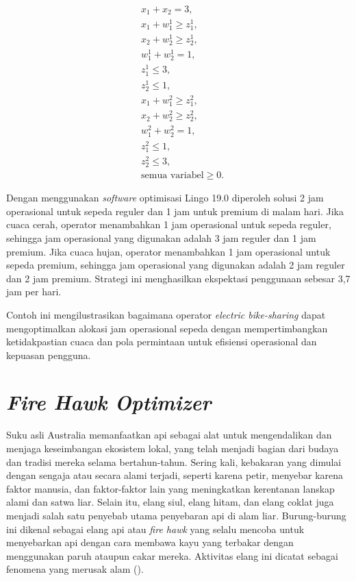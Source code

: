\begin{contoh}
    $$
    \begin{aligned}
    & x_1 + x_2 = 3, \\
    & x_1 + w_1^1 \geq z_1^1, \\
    & x_2 + w_2^1 \geq z_2^1, \\
    & w_1^1 + w_2^1 = 1, \\
    & z_1^1 \leq 3, \\
    & z_2^1 \leq 1, \\
    & x_1 + w_1^2 \geq z_1^2, \\
    & x_2 + w_2^2 \geq z_2^2, \\
    & w_1^2 + w_2^2 = 1, \\
    & z_1^2 \leq 1, \\
    & z_2^2 \leq 3, \\
    & \text{semua variabel} \geq 0.
    \end{aligned}
    $$
    
    Dengan menggunakan \textit{software} optimisasi Lingo 19.0 diperoleh solusi 2 jam operasional untuk sepeda reguler dan 1 jam untuk premium di malam hari. Jika cuaca cerah, operator menambahkan 1 jam operasional untuk sepeda reguler, sehingga jam operasional yang digunakan adalah 3 jam reguler dan 1 jam premium. Jika cuaca hujan, operator menambahkan 1 jam operasional untuk sepeda premium, sehingga jam operasional yang digunakan adalah 2 jam reguler dan 2 jam premium. Strategi ini menghasilkan ekspektasi penggunaan sebesar 3,7 jam per hari.
    
    Contoh ini mengilustrasikan bagaimana operator \textit{electric bike-sharing} dapat mengoptimalkan alokasi jam operasional sepeda dengan mempertimbangkan ketidakpastian cuaca dan pola permintaan untuk efisiensi operasional dan kepuasan pengguna.
    \label{contoh3.1.7}
\end{contoh}


\section{\textit{Fire Hawk Optimizer}}
Suku asli Australia memanfaatkan api sebagai alat untuk mengendalikan dan menjaga keseimbangan ekosistem lokal, yang telah menjadi bagian dari budaya dan tradisi mereka selama bertahun-tahun. Sering kali, kebakaran yang dimulai dengan sengaja atau secara alami terjadi, seperti karena petir, menyebar karena faktor manusia, dan faktor-faktor lain yang meningkatkan kerentanan lanskap alami dan satwa liar. Selain itu, elang siul, elang hitam, dan elang coklat juga menjadi salah satu penyebab utama penyebaran api di alam liar. Burung-burung ini dikenal sebagai elang api atau \textit{fire hawk} yang selalu mencoba untuk menyebarkan api dengan cara membawa kayu yang terbakar dengan menggunakan paruh ataupun cakar mereka. Aktivitas elang ini dicatat sebagai fenomena yang merusak alam ().\\

